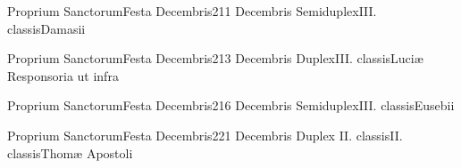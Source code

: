 \documentclass[liber-responsorialis_hiemalis.tex]{subfiles}
\begin{document}

	{Proprium Sanctorum}{Festa Decembris}{2}{11 Decembris}
	{Semiduplex}{III. classis}{Damasii}
	{\coporubric}
	{\respdetemp}


	{Proprium Sanctorum}{Festa Decembris}{2}{13 Decembris}
	{Duplex}{III. classis}{Luciæ}
	{Responsoria ut infra}
	{\respdetemp}
\rubric{\respdetemp}

	{Proprium Sanctorum}{Festa Decembris}{2}{16 Decembris}
	{Semiduplex}{III. classis}{Eusebii}
	{\umexrubric}
	{\respdetemp}

	{Proprium Sanctorum}{Festa Decembris}{2}{21 Decembris}
	{Duplex II. classis}{II. classis}{Thomæ Apostoli}
	{}
	{}
\rubric{\apexrubric}
	
\end{document}
